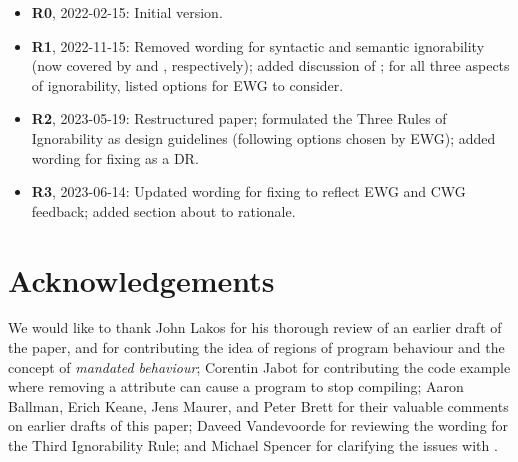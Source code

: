\begin{itemize}
\item \textbf{R0}, 2022-02-15: Initial version.
\item \textbf{R1}, 2022-11-15: Removed wording for syntactic and semantic ignorability (now covered by \cite{CWG2538} and \cite{CWG2695}, respectively); added discussion of ; for all three aspects of ignorability, listed options for EWG to consider.
\item \textbf{R2}, 2023-05-19: Restructured paper; formulated the Three Rules of Ignorability as design guidelines (following options chosen by EWG); added wording for fixing  as a DR.
\item \textbf {R3}, 2023-06-14: Updated wording for fixing  to reflect EWG and CWG feedback; added section about  to rationale.
\end{itemize}

\section*{Acknowledgements}
We would like to thank John Lakos for his thorough review of an earlier draft of the paper, and for contributing the idea of regions of program behaviour and the concept of \emph{mandated behaviour}; Corentin Jabot for contributing the code example where removing a \mbox{} attribute can cause a program to stop compiling; Aaron Ballman, Erich Keane, Jens Maurer, and Peter Brett for their valuable comments on earlier drafts of this paper; Daveed Vandevoorde for reviewing the wording for the Third Ignorability Rule; and Michael Spencer for clarifying the issues with .

\renewcommand{\bibname}{References}



